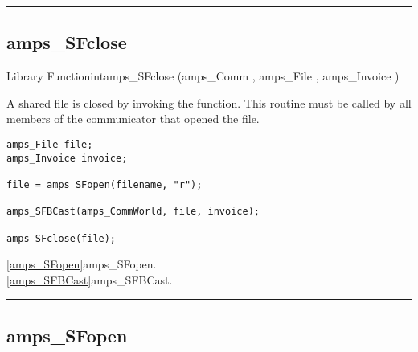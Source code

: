 
\noindent\rule{\textwidth}{1mm}

\subsection{amps\_SFclose}
\label{amps_SFclose}


\begin{deftypefn}{Library Function}{int}{amps\_SFclose}
(amps_Comm , amps_File , amps_Invoice ) 

\DESCRIPTION


A shared file is closed by invoking the  function.
This routine must be called by all members of the communicator that opened
the file.

\EXAMPLE
\begin{display}\begin{verbatim}
amps_File file;
amps_Invoice invoice;

file = amps_SFopen(filename, "r");

amps_SFBCast(amps_CommWorld, file, invoice);

amps_SFclose(file);
\end{verbatim}\end{display}

\SEEALSO
\vref{amps_SFopen}{amps\_SFopen}. \\
\vref{amps_SFBCast}{amps\_SFBCast}. \\

\end{deftypefn}


\noindent\rule{\textwidth}{1mm}

\subsection{amps\_SFopen}
\label{amps_SFopen}


